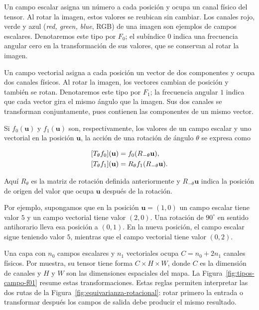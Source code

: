 Un campo escalar asigna un número a cada posición y ocupa un canal físico del
tensor. Al rotar la imagen, estos valores se reubican sin cambiar. Los canales
rojo, verde y azul (\emph{red, green, blue}, RGB) de una imagen son ejemplos de campos escalares.
Denotaremos este tipo por \(F_0\); el subíndice \(0\) indica una frecuencia
angular cero en la transformación de sus valores, que se conservan al rotar
la imagen.

Un campo vectorial asigna a cada posición un vector de dos componentes y
ocupa dos canales físicos. Al rotar la imagen, los vectores cambian de
posición y también se rotan. Denotaremos este tipo por \(F_1\); la frecuencia
angular \(1\) indica que cada vector gira el mismo ángulo que la imagen.
Sus dos canales se transforman conjuntamente, pues contienen las componentes
de un mismo vector.

Si \(f_0(\mathbf u)\) y \(f_1(\mathbf u)\) son, respectivamente, los valores
de un campo escalar y uno vectorial en la posición \(\mathbf u\), la acción
de una rotación de ángulo \(\theta\) se expresa como

\begin{equation}
    \begin{aligned}
        \relax[T_\theta f_0](\mathbf u)&=f_0(R_{-\theta}\mathbf u),\\
        \relax[T_\theta f_1](\mathbf u)&=R_\theta f_1(R_{-\theta}\mathbf u).
    \end{aligned}
    \label{eq:accion-campo-fn}
\end{equation}

Aquí \(R_\theta\) es la matriz de rotación definida anteriormente y
\(R_{-\theta}\mathbf u\) indica la posición de origen del valor que ocupa
\(\mathbf u\) después de la rotación.

Por ejemplo, supongamos que en la posición \(\mathbf u=(1,0)\) un campo
escalar tiene valor \(5\) y un campo vectorial tiene valor \((2,0)\). Una
rotación de \(90^\circ\) en sentido antihorario lleva esa posición a
\((0,1)\). En la nueva posición, el campo escalar sigue teniendo valor
\(5\), mientras que el campo vectorial tiene valor \((0,2)\).

Una capa con \(n_0\) campos escalares y \(n_1\) vectoriales ocupa
\(C=n_0+2n_1\) canales físicos. Por muestra, su tensor tiene forma
\(C\times H\times W\), donde \(C\) es la dimensión de canales y \(H\) y
\(W\) son las dimensiones espaciales del mapa. La
Figura~\ref{fig:tipos-campo-f01} resume estas transformaciones. Estas reglas
permiten interpretar las dos rutas de la
Figura~\ref{fig:equivarianza-rotacional}: rotar primero la entrada o
transformar después los campos de salida debe producir el mismo resultado.

